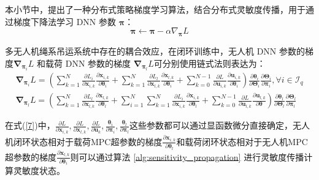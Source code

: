 \documentclass[lang=chs, degree=master, blindreview=true, winfonts=true]{yanputhesis}
\begin{document}
本小节中，提出了一种分布式策略梯度学习算法，结合分布式灵敏度传播，用于通过梯度下降法学习 DNN 参数 $\bm \pi$：
\begin{equation}
    \bm \pi\leftarrow \bm \pi-\alpha\nabla_{\bm \pi}L
\end{equation}

多无人机绳系吊运系统中存在的耦合效应，在闭环训练中，无人机 DNN 参数的梯度\( \bm{\nabla}_ {\bm \pi_i}  L \) 和载荷 DNN 参数的梯度 \( \bm{\nabla}_ {\bm \pi_l}  L \)可分别使用链式法则表达为：
\begin{equation}
	\begin{gathered}
		\bm{\nabla}_ {\bm \pi_i}  L = \left(\sum_{k=1}^{N} \frac{\partial L_i}{\partial \bm x_{i,k}} \frac{\partial \bm x_{i,k}}{\partial \bm \theta_i} + \sum_{k=1}^{N} \frac{\partial L_l}{\partial \bm x_{l,k}} \frac{\partial \bm x_{l,k}}{\partial \bm \theta_i} +\sum_{k=0}^{N-1} \frac{\partial L}{\partial \bm u_{i,k}} \frac{\partial \bm u_{i,k}}{\partial \bm \theta_i}\right)\frac{\partial\boldsymbol{\theta}_{i}}{\partial\boldsymbol{\Theta}_{i}}\frac{\partial\boldsymbol{\Theta}_{i}}{\partial\boldsymbol{\pi}_{i}},\forall i\in\mathcal{I}_q\\
		\bm{\nabla}_ {\bm \pi_l} L = \left(\sum_{k=1}^{N} \frac{\partial L_l}{\partial \bm x_{l,k}} \frac{\partial \bm x_{l,k}}{\partial \bm \theta_l} +\sum_{i=1}^{N} \sum_{k=1}^{N} \frac{\partial L_i}{\partial \bm x_{i,k}} \frac{\partial \bm x_{i,k}}{\partial \bm \theta_l} + \sum_{k=0}^{N-1} \frac{\partial L}{\partial \bm u_{l,k}} \frac{\partial \bm u_{l,k}}{\partial \bm \theta}\right)\frac{\partial\boldsymbol{\theta}_{l}}{\partial\boldsymbol{\Theta}_{l}}\frac{\partial\boldsymbol{\Theta}_{l}}{\partial\boldsymbol{\pi}_{l}}
	\end{gathered}
	\label{7}
\end{equation}

在式(\ref{7})中，$\frac{\partial L}{\partial \bm x_{i,k}} , \frac{\partial L}{\partial \bm x_{l,k}} , \frac{\partial L}{\partial \bm u_k} , \frac{\boldsymbol{\theta}_i}{\partial\boldsymbol{\pi}_i} , \frac{\boldsymbol{\theta}_l}{\partial\boldsymbol{\pi}_l}$这些参数都可以通过显函数微分直接确定，无人机闭环状态相对于载荷MPC超参数的梯度\(\frac{\partial \bm x_{i,k}}{\partial \bm \theta_l}\)和载荷闭环状态相对于无人机MPC超参数的梯度\(\frac{\partial \bm x_{l,k}}{\partial \bm \theta_i}\)则可以通过算法 \ref{alg:sensitivity_propagation} 进行灵敏度传播计算灵敏度状态。
\end{document}
